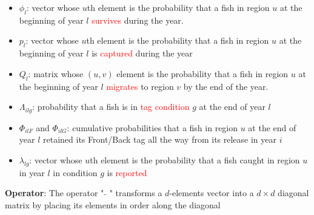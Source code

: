 \documentclass[paperwidth=58in,paperheight=47in,portrait]{baposter}
\begin{document}
\begin{poster}
{\begin{itemize}
\item $\phi_{l}$: vector whose $u$th element is the probability that a fish in region $u$ at the beginning of year $l$ \textcolor{red}{survives} during the year.
\item $p_{l}$: vector whose $u$th element is the probability that a fish in region $u$ at the beginning of year $l$ is \textcolor{red}{captured} during the year
\item $Q_{l}$: matrix whose $(u,v)$ element is the probability that a fish in region $u$ at the beginning of year $l$ \textcolor{red}{migrates} to region $v$ by the end of the year.
\item $\Lambda_{ilg}$: probability that a fish is in \textcolor{red}{tag condition} $g$ at the end of year $l$
\item $\Phi_{ilF}$ and $\Phi_{ilG}$: cumulative probabilities that a fish in region $u$ at the end of year $l$ retained its Front/Back tag all the way from its release in year $i$ 
\item $\lambda_{lg}$: vector whose $u$th element is the probability that a fish caught in region $u$ in year $l$ in condition $g$ is \textcolor{red}{reported}
%
\end{itemize}
\textbf{Operator}: The operator " $\tilde{ }$ " transforms a $d$-elements vector into a $d\times d$ diagonal matrix by placing its elements in order along the diagonal}


\end{poster}
\end{document}
